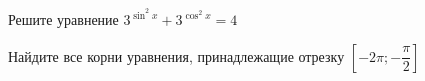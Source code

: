 \begin{ex}
	\begin{condition}
		\begin{enumcols}[label=\asbuk*)]
			\item Решите уравнение \( 3^{\sin^2 x} + 3^{\cos^2 x} =4 \)
			\item Найдите все корни уравнения, принадлежащие отрезку \( \left[-2\pi;-\dfrac{\pi}{2}\right] \)
		\end{enumcols}
	\end{condition}
\end{ex}